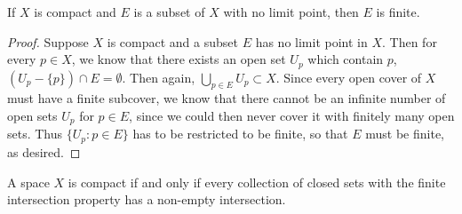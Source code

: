 \documentclass[a4paper,12pt,twoside]{hmcpset}
\begin{document}
\begin{problem}[Corollay 7.4] If $X$ is compact and $E$ is a subset of
    $X$ with no limit point, then $E$ is finite.
\end{problem}

\begin{proof}
    Suppose $X$ is compact and a subset $E$ has no limit point in $X$.
    Then for every $p \in X$, we know that there exists an open set
    $U_p$  which contain $p$, $(U_p - \{p\})\cap E = \emptyset$. Then
    again, $\bigcup_{p \in E} U_p \subset X$. Since every open cover
    of $X$ must have a finite subcover, we know that there cannot be
    an infinite number of open sets $U_p$ for $p \in E$, since we
    could then never cover it with finitely many open sets. Thus
    $\{U_p : p \in E\}$ has to be restricted to be finite, so that $E$
    must be finite, as desired.
\end{proof}

\begin{problem}[Theorem 7.5] A space $X$ is compact if and only if
    every collection of closed sets with the finite intersection
    property has a non-empty intersection.
\end{problem}
\end{document}

